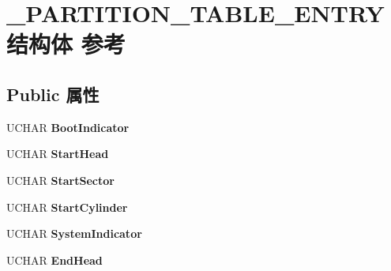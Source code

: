 \hypertarget{struct___p_a_r_t_i_t_i_o_n___t_a_b_l_e___e_n_t_r_y}{}\section{\+\_\+\+P\+A\+R\+T\+I\+T\+I\+O\+N\+\_\+\+T\+A\+B\+L\+E\+\_\+\+E\+N\+T\+R\+Y结构体 参考}
\label{struct___p_a_r_t_i_t_i_o_n___t_a_b_l_e___e_n_t_r_y}
\subsection*{Public 属性}
\begin{DoxyCompactItemize}
\item 
\mbox{\label{struct___p_a_r_t_i_t_i_o_n___t_a_b_l_e___e_n_t_r_y_a036c14f0ac8b66d1f339affa40203df2}} 
U\+C\+H\+AR {\bfseries Boot\+Indicator}
\item 
\mbox{\label{struct___p_a_r_t_i_t_i_o_n___t_a_b_l_e___e_n_t_r_y_af47bbc021e451016009663e3ef720283}} 
U\+C\+H\+AR {\bfseries Start\+Head}
\item 
\mbox{\label{struct___p_a_r_t_i_t_i_o_n___t_a_b_l_e___e_n_t_r_y_a4df73d70deae34034b3b04c3289f37b4}} 
U\+C\+H\+AR {\bfseries Start\+Sector}
\item 
\mbox{\label{struct___p_a_r_t_i_t_i_o_n___t_a_b_l_e___e_n_t_r_y_a1283f57de3ec3f01453db33f1bf22902}} 
U\+C\+H\+AR {\bfseries Start\+Cylinder}
\item 
\mbox{\label{struct___p_a_r_t_i_t_i_o_n___t_a_b_l_e___e_n_t_r_y_a6dafd1f0cab0bbadaf5ad25e9500693b}} 
U\+C\+H\+AR {\bfseries System\+Indicator}
\item 
\mbox{\label{struct___p_a_r_t_i_t_i_o_n___t_a_b_l_e___e_n_t_r_y_a8d87d01cfd72bc8b3281c7451c63bba3}} 
U\+C\+H\+AR {\bfseries End\+Head}
\item 
\mbox{\label{struct___p_a_r_t_i_t_i_o_n___t_a_b_l_e___e_n_t_r_y_aa5ff59873871899ae6877f12120b61b5}} 

\end{DoxyCompactItemize}
